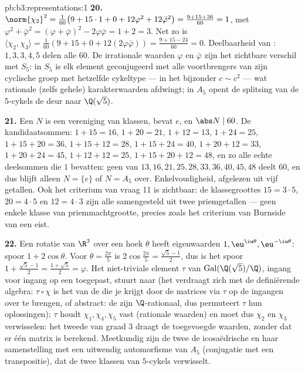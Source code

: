 \begin{solution}{pb:b3:representations:1}
\textbf{20.} $\norm{\chi_2}^2 = \frac1{60}\bigl(9 + 15\cdot1 + 0 +
12\varphi^2 + 12\bar\varphi^2\bigr) = \frac{9 + 15 + 36}{60} = 1$,
met $\varphi^2 + \bar\varphi^2 = (\varphi + \bar\varphi)^2 -
2\varphi\bar\varphi = 1 + 2 = 3$. Net zo is $\langle\chi_2,
\chi_3\rangle = \frac1{60}(9 + 15 + 0 + 12(2\varphi\bar\varphi)) =
\frac{9 + 15 - 24}{60} = 0$. Deelbaarheid van : $1, 3, 3,
4, 5$ delen alle $60$. De irrationale waarden $\varphi$ en
$\bar\varphi$ zijn het zichtbare verschil met $S_5$: in $S_5$ is
elk element geconjugeerd met alle voortbrengers van zijn cyclische
groep met hetzelfde cykeltype --- in het bijzonder $c \sim c^2$
--- wat rationale (zelfs gehele) karakterwaarden afdwingt; in
$A_5$ opent de splitsing van de $5$-cykels de deur naar
$\Q(\sqrt5)$.

\textbf{21.} Een  $N$ is een vereniging van klassen,
bevat $e$, en $\abs N \mid 60$. De kandidaatsommen: $1{+}15 = 16$,
$1{+}20 = 21$, $1{+}12 = 13$, $1{+}24 = 25$, $1{+}15{+}20 = 36$,
$1{+}15{+}12 = 28$, $1{+}15{+}24 = 40$, $1{+}20{+}12 = 33$,
$1{+}20{+}24 = 45$, $1{+}12{+}12 = 25$, $1{+}15{+}20{+}12 = 48$,
en zo alle echte deelsommen die $1$ bevatten: geen van $13, 16,
21, 25, 28, 33, 36, 40, 45, 48$ deelt $60$, en dus blijft alleen
$N = \{e\}$ of $N = A_5$ over. Enkelvoudigheid, afgelezen uit vijf
getallen. Ook het criterium van vraag 11 is zichtbaar: de
klassegroottes $15 = 3\cdot5$, $20 = 4\cdot5$ en $12 = 4\cdot3$
zijn alle samengesteld uit twee priemgetallen --- geen enkele
klasse van priemmachtgrootte, precies zoals het criterium van
Burnside van een  eist.

\textbf{22.} Een rotatie van $\R^3$ over een hoek $\theta$ heeft
eigenwaarden $1, \eu^{\iu\theta}, \eu^{-\iu\theta}$: spoor $1 +
2\cos\theta$. Voor $\theta = \frac{2\pi}5$ is $2\cos\frac{2\pi}5 =
\frac{\sqrt5 - 1}2$, dus is het spoor $1 + \frac{\sqrt5-1}2 =
\frac{1+\sqrt5}2 = \varphi$. Het niet-triviale element $\tau$ van
$\operatorname{Gal}(\Q(\sqrt5)/\Q)$, ingang voor ingang op een
 toegepast, stuurt  naar  (het
verdraagt zich met de definiërende algebra: $\tau\circ\chi$ is het
 van de  die je krijgt door de matrices via
$\tau$ op de ingangen over te brengen, of abstract: de
 zijn $\Q$-rationaal, dus permuteert
$\tau$ hun oplossingen); $\tau$ houdt $\chi_1, \chi_4, \chi_5$
vast (rationale waarden) en moet dus $\chi_2$ en $\chi_3$
verwisselen: het tweede  van graad $3$ draagt de
toegevoegde waarden, zonder dat er één matrix is berekend.
Meetkundig zijn de twee  de icosaëdrische  en
haar samenstelling met een uitwendig automorfisme van $A_5$
(conjugatie met een transpositie), dat de twee klassen van
$5$-cykels verwisselt.


\end{solution}
